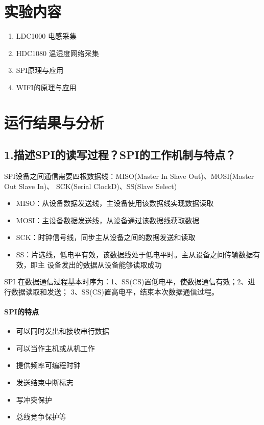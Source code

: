 \documentclass[a4paper]{ctexart}
\begin{document}
  \section{实验内容}
    \begin{enumerate}
      \item LDC1000 电感采集
      \item HDC1080 温湿度网络采集
      \item SPI原理与应用
      \item WIFI的原理与应用
    \end{enumerate}

  \section{运行结果与分析}
    \subsection*{1.描述SPI的读写过程？SPI的工作机制与特点？}
      SPI设备之间通信需要四根数据线：MISO(Master In Slave Out)、MOSI(Master Out Slave In)、
      SCK(Serial ClockD)、SS(Slave Select)
      \begin{itemize}
        \item MISO：从设备数据发送线，主设备使用该数据线实现数据读取
        \item MOSI：主设备数据发送线，从设备通过该数据线获取数据
        \item SCK：时钟信号线，同步主从设备之间的数据发送和读取
        \item SS：片选线，低电平有效，该数据线处于低电平时。主从设备之间传输数据有效，即主
        设备发出的数据从设备能够读取成功
      \end{itemize}
      SPI 在数据通信过程基本时序为：1、SS(CS)置低电平，使数据通信有效；2、进行数据读取和发送；
      3、SS(CS)置高电平，结束本次数据通信过程。
      \paragraph*{SPI的特点}
      \begin{itemize}
        \item 可以同时发出和接收串行数据
        \item 可以当作主机或从机工作
        \item 提供频率可编程时钟
        \item 发送结束中断标志
        \item 写冲突保护
        \item 总线竞争保护等
      \end{itemize}
\end{document}
